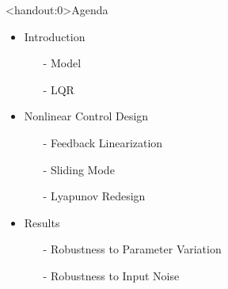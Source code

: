 \begin{frame}<handout:0>{Agenda}{}
  \begin{itemize}
    \item Introduction
    \begin{itemize}
      \item[-] Model
      \item[-] LQR
    \end{itemize}
    \item Nonlinear Control Design
    \begin{itemize}
      \item[-] Feedback Linearization
      \item[-] Sliding Mode
      \item[-] Lyapunov Redesign
    \end{itemize}
    \item Results
    \begin{itemize}
      \item[-] Robustness to Parameter Variation
      \item[-] Robustness to Input Noise
    \end{itemize}
  \end{itemize}
\end{frame}
